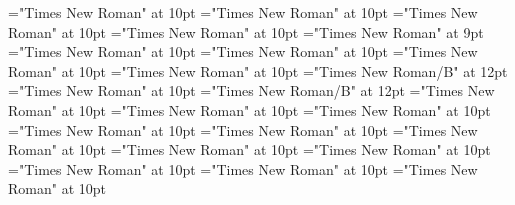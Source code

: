 \documentclass[gps1,twoside]{article}
\begin{document}
\font\summaryvisiblevariantentryrefvisiblevariantentryrefsminorentryvariantbefore="Times New Roman" at 10pt
\font\spansummaryvisiblevariantentryrefvisiblevariantentryrefsminorentryvariantfirstchildbefore="Times New Roman" at 10pt
\font\complexformentryrefsminorentryvariantbefore="Times New Roman" at 10pt
\font\complexformentryrefsminorentryvariantafter="Times New Roman" at 10pt
\font\complexformtypecomplexformtypecomplexformtypescomplexformentryrefcomplexformentryrefsminorentryvariantbefore="Times New Roman" at 9pt
\font\complexformtypescomplexformentryrefcomplexformentryrefsminorentryvariantafter="Times New Roman" at 10pt
\font\abbreviationcomplexformtypecomplexformtypescomplexformentryrefcomplexformentryrefsminorentryvariantbefore="Times New Roman" at 10pt
\font\spanabbreviationcomplexformtypecomplexformtypescomplexformentryrefcomplexformentryrefsminorentryvariantlastchildafter="Times New Roman" at 10pt
\font{}="Times New Roman" at 10pt
\font\spanbzhheadwordreferencedentryreferencedentriescomplexformentryrefcomplexformentryrefsminorentryvariant="Times New Roman/B" at 12pt
\font\headwordreferencedentryreferencedentriescomplexformentryrefcomplexformentryrefsminorentryvariantbefore="Times New Roman" at 10pt
\font\spanheadwordreferencedentryreferencedentriescomplexformentryrefcomplexformentryrefsminorentryvariant="Times New Roman/B" at 12pt
\font{}="Times New Roman" at 10pt
\font\spandefinitionorglossreferencedentryreferencedentriescomplexformentryrefcomplexformentryrefsminorentryvariantfirstchildbefore="Times New Roman" at 10pt
\font\summarycomplexformentryrefcomplexformentryrefsminorentryvariantbefore="Times New Roman" at 10pt
\font\spansummarycomplexformentryrefcomplexformentryrefsminorentryvariantfirstchildbefore="Times New Roman" at 10pt
\font\nontrivialentryrootnontrivialentryrootnontrivialentryrootscomplexformentryrefcomplexformentryrefsminorentryvariantbefore="Times New Roman" at 10pt
\font\nontrivialentryrootscomplexformentryrefcomplexformentryrefsminorentryvariantbefore="Times New Roman" at 10pt
\font\summarydefinitionminorentryvariantbefore="Times New Roman" at 10pt
\font\spansummarydefinitionminorentryvariantfirstchildbefore="Times New Roman" at 10pt
\font\spansummarydefinitionminorentryvariantlastchildafter="Times New Roman" at 10pt
\font\visiblecomplexformbackrefsminorentryvariantbefore="Times New Roman" at 10pt
\font\visiblecomplexformbackrefsminorentryvariantafter="Times New Roman" at 10pt
\end{document}
